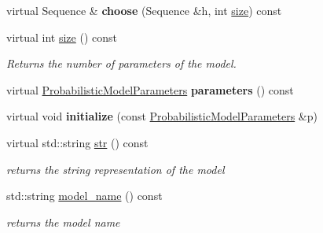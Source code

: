 \begin{DoxyCompactItemize}
\mbox{\label{classtops_1_1PhasedRunLengthDistribution_a45b778dbb694a98410815a141fae15fc}} 
virtual Sequence \& {\bfseries choose} (Sequence \&h, int \hyperlink{classtops_1_1PhasedRunLengthDistribution_a1eeb20f70058842d6166ce07628b32f8}{size}) const
\item 
\mbox{\label{classtops_1_1PhasedRunLengthDistribution_a1eeb20f70058842d6166ce07628b32f8}} 
virtual int \hyperlink{classtops_1_1PhasedRunLengthDistribution_a1eeb20f70058842d6166ce07628b32f8}{size} () const
\begin{DoxyCompactList}\small\item\em Returns the number of parameters of the model. \end{DoxyCompactList}\item 
\mbox{\label{classtops_1_1PhasedRunLengthDistribution_a56fc08b990179dea63fd2fbc71748645}} 
virtual \hyperlink{classtops_1_1ProbabilisticModelParameters}{Probabilistic\+Model\+Parameters} {\bfseries parameters} () const
\item 
\mbox{\label{classtops_1_1PhasedRunLengthDistribution_acee6ce5284db10529fbf929d7dbb111b}} 
virtual void {\bfseries initialize} (const \hyperlink{classtops_1_1ProbabilisticModelParameters}{Probabilistic\+Model\+Parameters} \&p)
\item 
\mbox{\label{classtops_1_1PhasedRunLengthDistribution_ac1755e1d7c2b1011c477a6184a7cadda}} 
virtual std\+::string \hyperlink{classtops_1_1PhasedRunLengthDistribution_ac1755e1d7c2b1011c477a6184a7cadda}{str} () const
\begin{DoxyCompactList}\small\item\em returns the string representation of the model \end{DoxyCompactList}\item 
\mbox{\label{classtops_1_1PhasedRunLengthDistribution_a0ac8bc022047c1e8b1fa3a4f3a69aa30}} 
std\+::string \hyperlink{classtops_1_1PhasedRunLengthDistribution_a0ac8bc022047c1e8b1fa3a4f3a69aa30}{model\+\_\+name} () const
\begin{DoxyCompactList}\small\item\em returns the model name \end{DoxyCompactList}\end{DoxyCompactItemize}


